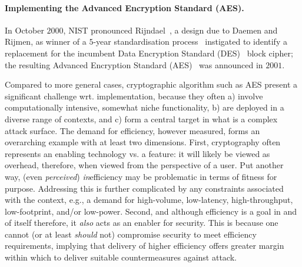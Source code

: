 
\paragraph{Implementing the Advanced Encryption Standard (AES).}

In October $2000$, NIST pronounced Rijndael~\cite{DaeRij:98,DaeRij:02}, 
a design due to Daemen and Rijmen, 
as winner of a $5$-year standardisation process~\cite{NBBBDFR:01} instigated 
to identify a replacement for the incumbent
Data     Encryption Standard (DES)~\cite{FIPS:46} 
block cipher; the resulting 
Advanced Encryption Standard (AES)~\cite{FIPS:197} 
was announced in $2001$.

Compared to more general cases, cryptographic algorithm such as AES present a
significant challenge wrt. implementation, because they often
a) involve computationally intensive, somewhat niche functionality,
b) are deployed in a diverse range of contexts,
   and
c) form a central target in what is a complex attack surface.
The demand for efficiency, however measured, forms an overarching example
with at least two dimensions.
First,
cryptography often represents an enabling technology vs. a feature: it will
likely be viewed as overhead, therefore, when viewed from the perspective 
of a user.  Put another way,  (even {\em perceived}) {\em in}efficiency may
be problematic in terms of fitness for purpose.  Addressing this is further 
complicated by any constraints associated with the context, e.g., a demand 
for
high-volume, 
 low-latency, 
high-throughput, 
 low-footprint, 
and/or 
 low-power.
Second,
and although efficiency is a goal in and of itself therefore, it {\em also} 
acts as an enabler for security.  This is because one cannot 
(or at least {\em should} not) 
compromise security to meet efficiency requirements, implying that delivery 
of higher efficiency offers greater margin within which to deliver suitable
countermeasures against attack.

